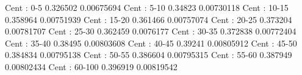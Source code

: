 Cent : 0-5
0.326502 0.00675694
Cent : 5-10
0.34823 0.00730118
Cent : 10-15
0.358964 0.00751939
Cent : 15-20
0.361466 0.00757074
Cent : 20-25
0.373204 0.00781707
Cent : 25-30
0.362459 0.0076177
Cent : 30-35
0.372838 0.00772404
Cent : 35-40
0.38495 0.00803608
Cent : 40-45
0.39241 0.00805912
Cent : 45-50
0.384834 0.00795138
Cent : 50-55
0.386604 0.00795315
Cent : 55-60
0.387949 0.00802434
Cent : 60-100
0.396919 0.00819542
